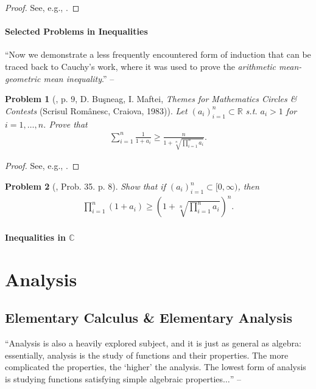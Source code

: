 \documentclass[oneside]{book}
\numberwithin{equation}{section}
\newtheorem{problem}{Problem}[section]
\begin{document}
\begin{proof}[Proof]
	See, e.g., \cite[pp. 38--39]{Gelca_Andreescu2017}.
\end{proof}

\subsection{Selected Problems in Inequalities}
``Now we demonstrate a less frequently encountered form of induction that can be traced back to Cauchy's work, where it was used to prove the \textit{arithmetic mean-geometric mean inequality}.'' -- \cite[p. 9]{Gelca_Andreescu2017}

\begin{problem}[\cite{Gelca_Andreescu2017}, p. 9, D. Buşneag, I. Maftei, \textit{Themes for Mathematics Circles \& Contests} (Scrisul Românesc, Craiova, 1983)]
	Let $(a_i)_{i=1}^n\subset\mathbb{R}$ s.t. $a_i > 1$ for $i = 1,\ldots,n$. Prove that
	\begin{align*}
		\sum_{i=1}^n \frac{1}{1 + a_i}\ge\frac{n}{1 + \sqrt[n]{\prod_{i=1}^n a_i}}.
	\end{align*}
\end{problem}

\begin{proof}[Proof]
	See, e.g., \cite[pp. 9--10]{Gelca_Andreescu2017}.
\end{proof}

\begin{problem}[\cite{Gelca_Andreescu2017}, Prob. 35. p. 8]
	Show that if $(a_i)_{i=1}^n\subset[0,\infty)$, then
	\begin{align*}
		\prod_{i=1}^n (1 + a_i)\ge\left(1 + \sqrt[n]{\prod_{i=1}^n a_i}\right)^n.
	\end{align*}
\end{problem}

\subsection{Inequalities in $\mathbb{C}$}


\part{Analysis}

\chapter{Elementary Calculus \& Elementary Analysis}
``Analysis is also a heavily explored subject, and it is just as general as algebra: essentially, analysis is the study of functions and their properties. The more complicated the properties, the `higher' the analysis. The lowest form of analysis is studying functions satisfying simple algebraic properties$\ldots$'' -- \cite[Chap. 3, p. 36]{Tao2006}
\end{document}
